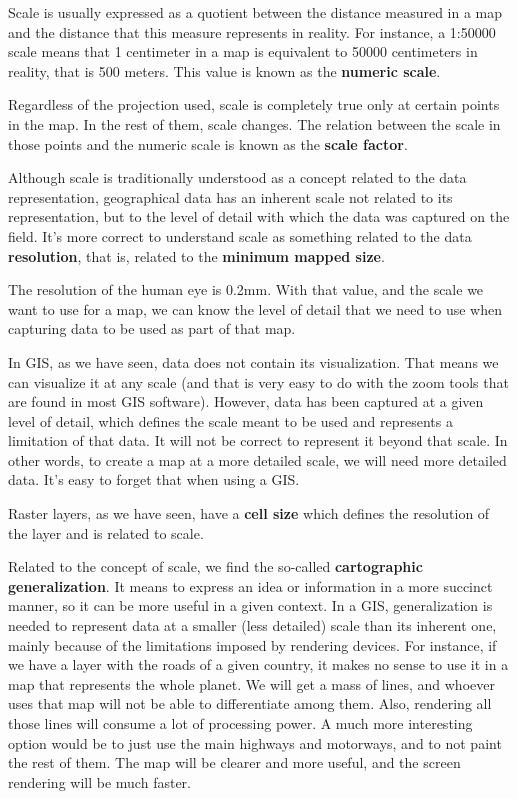 Scale is usually expressed as a quotient between the distance measured in a map and the distance that this measure represents in reality. For instance, a 1:50000 scale means that 1 centimeter in a map is equivalent to 50000 centimeters in reality, that is 500 meters. This value is known as the \textbf{numeric scale}.

Regardless of the projection used, scale is completely true only at certain points in the map. In the rest of them, scale changes. The relation between the scale in those points and the numeric scale is known as the \textbf{scale factor}.

Although scale is traditionally understood as a concept related to the data representation, geographical data has an inherent scale not related to its representation, but to the level of detail with which the data was captured on the field. It's more correct to understand scale as something related to the data \textbf{resolution}, that is, related to the \textbf{minimum mapped size}.

The resolution of the human eye is 0.2mm. With that value, and the scale we want to use for a map, we can know the level of detail that we need to use when capturing data to be used as part of that map. 

In GIS, as we have seen, data does not contain its visualization. That means we can visualize it at any scale (and that is very easy to do with the zoom tools that are found in most GIS software). However, data has been captured at a given level of detail, which defines the scale meant to be used and represents a limitation of that data. It will not be correct to represent it beyond that scale. In other words, to create a map at a more detailed scale, we will need more detailed data. It's easy to forget that when using a GIS.

Raster layers, as we have seen, have a \textbf{cell size} which defines the resolution of the layer and is related to scale.

Related to the concept of scale, we find the so-called \textbf{cartographic generalization}. It means to express an idea or information in a more succinct manner, so it can be more useful in a given context. In a GIS, generalization is needed to represent data at a smaller (less detailed) scale than its inherent one, mainly because of the limitations imposed by rendering devices. For instance, if we have a layer with the roads of a given country, it makes no sense to use it in a map that represents the whole planet. We will get a mass of lines, and whoever uses that map will not be able to differentiate among them. Also, rendering all those lines will consume a lot of processing power. A much more interesting option would be to just use the main highways and motorways, and to not paint the rest of them. The map will be clearer and more useful, and the screen rendering will be much faster.

